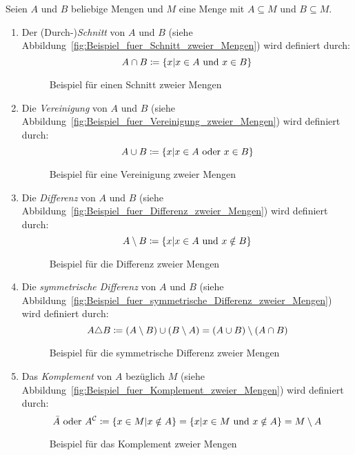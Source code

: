 \begin{definition}[Mengenoperationen]
Seien $A$ und $B$ beliebige Mengen und $M$ eine Menge mit $A \subseteq M$ und $B \subseteq M$.
\begin{enumerate}
\item Der (Durch-)\emph{Schnitt} von $A$ und $B$ (siehe Abbildung~\vref{fig:Beispiel_fuer_Schnitt_zweier_Mengen}) wird definiert durch:
	\[A \cap B \mathrel{\mathop:\!\!=} \left\{x \vert x \in A \text{ und } x \in B\right\}\]
	\begin{figure}[htb]
	\centering
	
	\caption{Beispiel für einen Schnitt zweier Mengen}
	\label{fig:Beispiel_fuer_Schnitt_zweier_Mengen}
	\end{figure}

\item Die \emph{Vereinigung} von $A$ und $B$ (siehe Abbildung~\vref{fig:Beispiel_fuer_Vereinigung_zweier_Mengen}) wird definiert durch:
	\[A \cup B \mathrel{\mathop:\!\!=} \left\{x \vert x \in A \text{ oder } x \in B\right\}\]
	\begin{figure}[htb]
	\centering
	
	\caption{Beispiel für eine Vereinigung zweier Mengen}
	\label{fig:Beispiel_fuer_Vereinigung_zweier_Mengen}
	\end{figure}

\item Die \emph{Differenz} von $A$ und $B$ (siehe Abbildung~\vref{fig:Beispiel_fuer_Differenz_zweier_Mengen}) wird definiert durch:
	\[A \setminus B \mathrel{\mathop:\!\!=} \left\{x \vert x \in A \text{ und } x \notin B\right\}\]
	\begin{figure}[htb]
	\centering
	
	\caption{Beispiel für die Differenz zweier Mengen}
	\label{fig:Beispiel_fuer_Differenz_zweier_Mengen}
	\end{figure}

\item Die \emph{symmetrische Differenz} von $A$ und $B$ (siehe Abbildung~\vref{fig:Beispiel_fuer_symmetrische_Differenz_zweier_Mengen}) wird definiert durch:
	\[A \triangle B \mathrel{\mathop:\!\!=} \left(A \setminus B\right) \cup \left(B \setminus A\right) = \left(A \cup B\right) \setminus \left(A \cap B\right)\]
	\begin{figure}[htb]
	\centering
	
	\caption{Beispiel für die symmetrische Differenz zweier Mengen}
	\label{fig:Beispiel_fuer_symmetrische_Differenz_zweier_Mengen}
	\end{figure}

\item Das \emph{Komplement} von $A$ bezüglich $M$ (siehe Abbildung~\vref{fig:Beispiel_fuer_Komplement_zweier_Mengen}) wird definiert durch:
	\[\bar{A} \text{ oder } A^{\mathcal{C}} \mathrel{\mathop:\!\!=} \left\{x \in M \vert x \notin A\right\} = \left\{x \vert x \in M \text{ und } x \notin A\right\} = M \setminus A\]
	\begin{figure}[htb]
	\centering
	
	\caption{Beispiel für das Komplement zweier Mengen}
	\label{fig:Beispiel_fuer_Komplement_zweier_Mengen}
	\end{figure}


\end{enumerate}
\end{definition}
